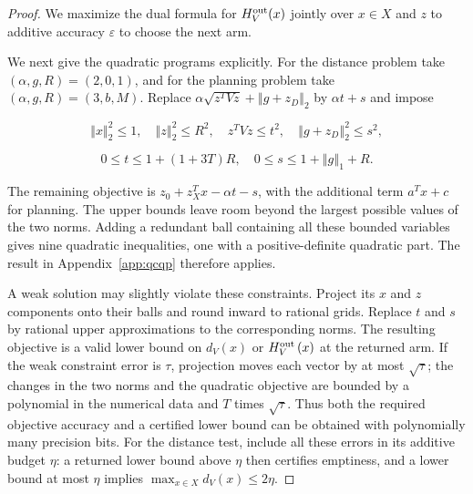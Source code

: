 {{\begin{proof}
We maximize the dual formula for $H_{V}^{\text{\normalfont out}}(x)$ jointly over $x\in X$ and $z$ to additive
accuracy $\varepsilon$ to choose the next arm.

We next give the quadratic programs explicitly. For the distance
problem take $\left( \alpha , g , R \right) = \left( 2 , 0 , 1 \right)$, and for the planning problem take
$\left( \alpha , g , R \right) = \left( 3 , b , M \right)$. Replace
$\alpha \sqrt{z^{T} V z} + {\left\Vert g + z_{D} \right\Vert}_{2}$ by $\alpha t + s$ and impose


\begin{equation*}
{\left\Vert x \right\Vert}_{2}^{2} \le 1 , \quad {\left\Vert z \right\Vert}_{2}^{2} \le R^{2} , \quad z^{T} V z \le t^{2} , \quad {\left\Vert g + z_{D} \right\Vert}_{2}^{2} \le s^{2} ,
\end{equation*}



\begin{equation*}
0 \le t \le 1 + \left( 1 + 3 T \right) R , \quad 0 \le s \le 1 + {\left\Vert g \right\Vert}_{1} + R .
\end{equation*}


The remaining objective is $z_{0} + z_{X}^{T} x - \alpha t - s$, with the additional
term $a^{T} x + c$ for planning. The upper bounds leave room beyond the
largest possible values of the two norms. Adding a redundant ball
containing all these bounded variables gives nine quadratic
inequalities, one with a positive-definite quadratic part.
The result in Appendix~\ref{app:qcqp} therefore applies.

A weak solution may slightly violate these constraints. Project its
$x$ and $z$ components onto their balls and round inward to rational
grids. Replace $t$ and $s$ by rational upper approximations to the
corresponding norms. The resulting objective is a valid lower bound
on $d_{V} \left( x \right)$ or $H_{V}^{\text{\normalfont out}} \left( x \right)$ at the returned arm. If the weak
constraint error is $\tau$, projection moves each vector by at most
$\sqrt{\tau}$; the changes in the two norms and the quadratic objective
are bounded by a polynomial in the numerical data and $T$ times
$\sqrt{\tau}$. Thus both the required objective accuracy and a certified
lower bound can be obtained with polynomially many precision bits.
For the distance test, include all these errors in its additive
budget $\eta$: a returned lower bound above $\eta$ then certifies
emptiness, and a lower bound at most $\eta$ implies
$\operatorname*{max}_{x \in X} d_{V} \left( x \right) \le 2 \eta$.


\end{proof}}}
